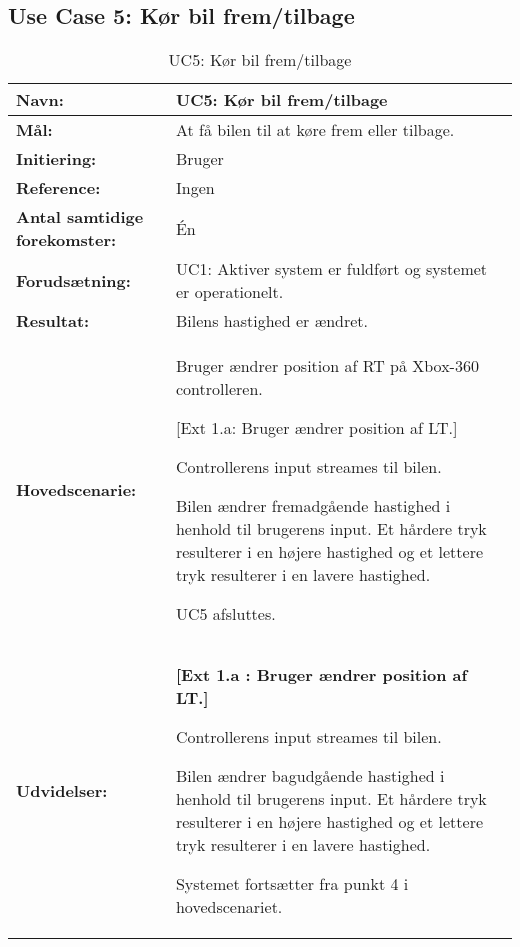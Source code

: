 \subsection{Use Case 5: Kør bil frem/tilbage}
\begin{table}[h]
\begin{tabularx}{\textwidth}{| L{3.3 cm} | Z |}										 				\hline

\textbf{Navn:} 						& UC5: Kør bil frem/tilbage										\\ \hline
\textbf{Mål:}						& At få bilen til at køre frem eller tilbage. 					\\ \hline
\textbf{Initiering:}				& Bruger 														\\ \hline
\textbf{Reference:} 				& Ingen 														\\ \hline
\textbf{Antal samtidige forekomster:} & Én 															\\ \hline
\textbf{Forudsætning:} 				& UC1: Aktiver system er fuldført og systemet er operationelt. 	\\ \hline
\textbf{Resultat:}					& Bilens hastighed er ændret. 									\\ \hline
\textbf{Hovedscenarie:}				& 

\begin{packed_enum}
	\item Bruger ændrer position af RT på Xbox-360 controlleren.
	\begin{packed_item}\itemsep1pt \parskip0pt 
		\item {[}Ext 1.a: Bruger ændrer position af LT.{]}
	\end{packed_item}
	\item Controllerens input streames til bilen.
	\item Bilen ændrer fremadgående hastighed i henhold til brugerens input. Et hårdere tryk resulterer i en højere hastighed og et lettere tryk resulterer i en lavere hastighed.
	\item UC5 afsluttes.
\end{packed_enum} \\ \hline
\textbf{Udvidelser:}				&  
\textbf{{[}Ext 1.a : Bruger ændrer position af LT.{]}}
	\begin{packed_enum}\itemsep1pt \parskip0pt 
		\item Controllerens input streames til bilen.
		\item Bilen ændrer bagudgående hastighed i henhold til brugerens input. Et hårdere tryk resulterer i en højere hastighed og et lettere tryk resulterer i en lavere hastighed.
		\item Systemet fortsætter fra punkt 4 i hovedscenariet.
	\end{packed_enum}																			\\ \hline
\end{tabularx}
\caption{UC5: Kør bil frem/tilbage}
\label{tbl:UC5}
\end{table}